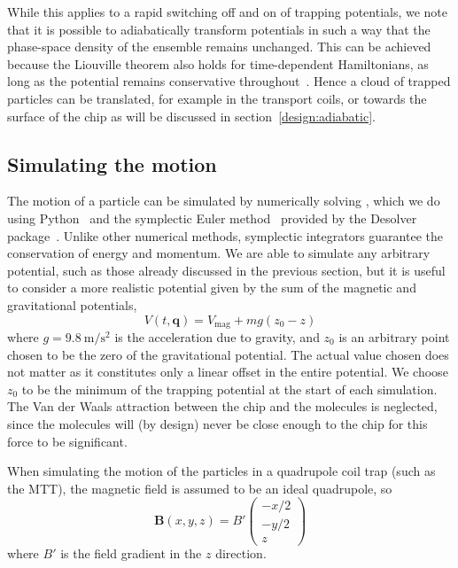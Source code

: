 While this applies to a rapid switching off and on of trapping potentials, we
note that it is possible to adiabatically transform potentials in such a way
that the phase-space density of the ensemble remains unchanged. This can be
achieved because the Liouville theorem also holds for time-dependent
Hamiltonians, as long as the potential remains conservative
throughout~\cite{Hand1998, Lichtenberg1969}. Hence a cloud of trapped particles
can be translated, for example in the transport coils, or towards the surface
of the chip as will be discussed in section~\ref{design:adiabatic}.

\subsection{Simulating the motion}
\label{design:motion:simmethods}

The motion of a particle can be simulated by numerically solving
, which we do using Python~\cite{python} and the
symplectic Euler method~\cite{Hairer2015, doi:10.1119/1.2034523} provided by
the Desolver package~\cite{desolver}. Unlike other numerical methods,
symplectic integrators guarantee the conservation of energy and momentum.
We are able to simulate any arbitrary potential, such as those already
discussed in the previous section, but it is useful to consider a more
realistic potential given by the sum of the magnetic and gravitational
potentials,
%
\begin{equation}
  V(t, \mathbf{q}) = V_\text{mag} + mg(z_0-z)
\end{equation}
where $g=\SI{9.8}{\meter\per\second\squared}$ is the acceleration due to
gravity, and $z_0$ is an arbitrary point chosen to be the zero of the
gravitational potential. The actual value chosen does not matter as it
constitutes only a linear offset in the entire potential. We choose
$z_0$ to be the minimum of the trapping potential at the start of each
simulation.
%
The Van der Waals attraction between the chip and the molecules is neglected,
since the molecules will (by design) never be close enough to the chip for this
force to be significant.

When simulating the motion of the particles in a quadrupole coil trap (such as
the MTT), the magnetic field is assumed to be an ideal quadrupole, so
%
\begin{equation}
  \mathbf{B}(x, y, z) = B'\begin{pmatrix} -x/2 \\ -y/2 \\ z \end{pmatrix}
\end{equation}
where $B'$ is the field gradient in the $z$ direction. 

